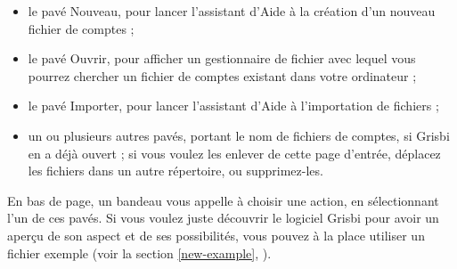 \begin{itemize}
	 \item le pavé Nouveau, pour lancer l'assistant d'Aide à la création d'un nouveau fichier de comptes ;
	 \item le pavé Ouvrir, pour afficher un gestionnaire de fichier avec lequel vous pourrez chercher un fichier de comptes existant dans votre ordinateur ;
	 \item le pavé Importer, pour lancer l'assistant d'Aide à l'importation de fichiers ;
	 \item un ou plusieurs autres pavés, portant le nom de fichiers de comptes, si Grisbi en a déjà ouvert ; si vous voulez les enlever de cette page d'entrée, déplacez les fichiers dans un autre répertoire, ou supprimez-les.
\end{itemize}







En bas de page, un bandeau vous appelle à choisir une action, en sélectionnant l'un de ces pavés. Si vous voulez juste découvrir le logiciel Grisbi pour avoir un aperçu de son aspect et de ses possibilités, vous pouvez à la place utiliser un fichier exemple (voir la section \vref{new-example}, ).
















